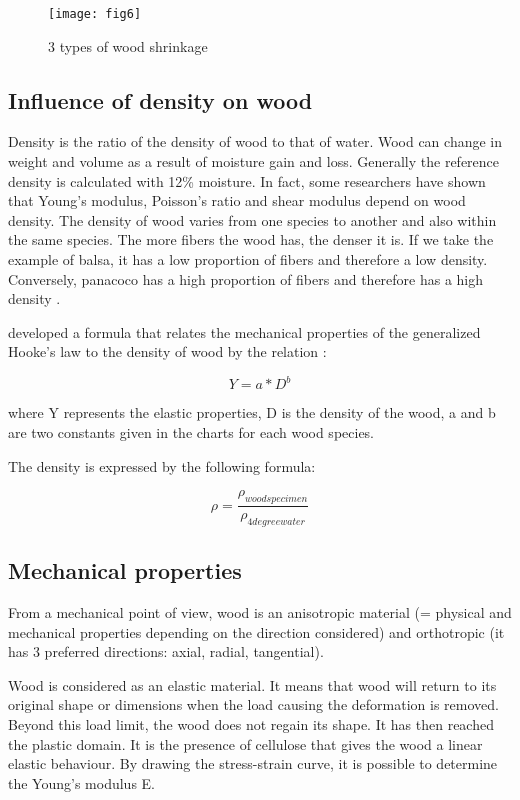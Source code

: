 \begin{figure}[htp]
	\centering
	\texttt{[image: fig6]}
	\caption{3 types of wood shrinkage}
	\label{fig:galaxy}
\end{figure}

\subsection{Influence of density on wood}

Density is the ratio of the density of wood to that of water. Wood can change in weight and volume as a result of moisture gain and loss. Generally the reference density is calculated with 12\% moisture. In fact, some researchers have shown that Young's modulus, Poisson's ratio and shear modulus depend on wood density. The density of wood varies from one species to another and also within the same species. The more fibers the wood has, the denser it is. If we take the example of balsa, it has a low proportion of fibers and therefore a low density. Conversely, panacoco has a high proportion of fibers and therefore has a high density \cite{Thibaut2015phd}.

\cite{BodigandJayne1982}  developed a formula that relates the mechanical properties of the generalized Hooke's law to the density of wood by the relation :

\begin{equation}
	Y = a*D^b
\end{equation}

where Y represents the elastic properties, D is the density of the wood, a and b are two constants given in the charts for each wood species.

The density is expressed by the following formula:

\begin{equation}
	\rho = \frac{\rho_{woodspecimen}}{\rho_{4degreewater}}
\end{equation}

\subsection{Mechanical properties}

From a mechanical point of view, wood is an anisotropic material (= physical and mechanical properties depending on the direction considered) and orthotropic (it has 3 preferred directions: axial, radial, tangential). 

Wood is considered as an elastic material. It means that wood will return to its original shape or dimensions when the load causing the deformation is removed. Beyond this load limit, the wood does not regain its shape. It has then reached the plastic domain. It is the presence of cellulose that gives the wood a linear elastic behaviour. By drawing the stress-strain curve, it is possible to determine the Young's modulus E.


